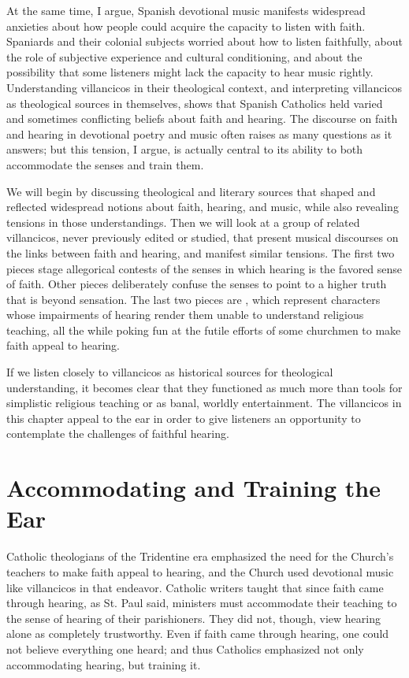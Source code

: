 At the same time, I argue, Spanish devotional music manifests widespread
anxieties about how people could acquire the capacity to listen with faith.
Spaniards and their colonial subjects worried about how to listen faithfully,
about the role of subjective experience and cultural conditioning, and about the
possibility that some listeners might lack the capacity to hear music rightly.
Understanding villancicos in their theological context, and interpreting
villancicos as theological sources in themselves, shows that Spanish Catholics
held varied and sometimes conflicting beliefs about faith and hearing.  The
discourse on faith and hearing in devotional poetry and music often raises as
many questions as it answers; but this tension, I argue, is actually central to
its ability to both accommodate the senses and train them.

We will begin by discussing theological and literary sources that shaped and
reflected widespread notions about faith, hearing, and music, while also
revealing tensions in those understandings.
Then we will look at a group of related villancicos, never previously edited or
studied, that present musical discourses on the links between faith and hearing,
and manifest similar tensions.
The first two pieces stage allegorical contests of the senses in which hearing
is the favored sense of faith.
Other pieces deliberately confuse the senses to point to a higher truth that is
beyond sensation.
The last two pieces are , which represent
characters whose impairments of hearing render them unable to understand
religious teaching, all the while poking fun at the futile efforts of some
churchmen to make faith appeal to hearing.

If we listen closely to villancicos as historical sources for theological
understanding, it becomes clear that they functioned as much more than tools for
simplistic religious teaching or as banal, worldly entertainment.
The villancicos in this chapter appeal to the ear in order to give listeners an
opportunity to contemplate the challenges of faithful hearing.

\section{Accommodating and Training the Ear}

Catholic theologians of the Tridentine era emphasized the need for the Church's
teachers to make faith appeal to hearing, and the Church used devotional music
like villancicos in that endeavor.
Catholic writers taught that since faith came through hearing, as St. Paul said,
ministers must accommodate their teaching to the sense of hearing of their
parishioners.
They did not, though, view hearing alone as completely trustworthy.
Even if faith came through hearing, one could not believe everything one heard;
and thus Catholics emphasized not only accommodating hearing, but training it.

